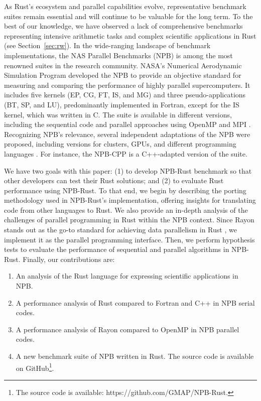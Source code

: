 As Rust's ecosystem and parallel capabilities evolve, representative benchmark suites remain essential and will continue to be valuable for the long term. To the best of our knowledge, we have observed a lack of comprehensive benchmarks representing intensive arithmetic tasks and complex scientific applications in Rust (see Section~\ref{sec:rw}). In the wide-ranging landscape of benchmark implementations, the NAS Parallel Benchmarks (NPB) \cite{NPBOriginal1} is among the most renowned suites in the research community. NASA's Numerical Aerodynamic Simulation Program developed the NPB to provide an objective standard for measuring and comparing the performance of highly parallel supercomputers. It includes five kernels (EP, CG, FT, IS, and MG) and three pseudo-applications (BT, SP, and LU), predominantly implemented in Fortran, except for the IS kernel, which was written in C. The suite is available in different versions, including the sequential code and parallel approaches using OpenMP \cite{nasomp} and MPI \cite{NPB-2.0}. Recognizing NPB's relevance, several independent adaptations of the NPB were proposed, including versions for clusters, GPUs, and different programming languages \cite{NPB-CPP-2021, NPB-MPJ, NPB-PY, NPB-CUDA, npb-opencl, npb-openacc}. For instance, the NPB-CPP \cite{NPB-CPP-2021} is a C++-adapted version of the suite. 

We have two goals with this paper: (1) to develop NPB-Rust benchmark so that other developers can test their Rust solutions; and (2) to evaluate Rust performance using NPB-Rust. To that end, we begin by describing the porting methodology used in NPB-Rust's implementation, offering insights for translating code from other languages to Rust. We also provide an in-depth analysis of the challenges of parallel programming in Rust within the NPB context. Since Rayon stands out as the go-to standard for achieving data parallelism in Rust \cite{PIEPER:COLA:21}, we implement it as the parallel programming interface. Then, we perform hypothesis tests to evaluate the performance of sequential and parallel algorithms in NPB-Rust. Finally, 
%
our contributions are:
\begin{enumerate}
    \item An analysis of the Rust language for expressing scientific applications in NPB.
    \item A performance analysis of Rust compared to Fortran and C++ in NPB serial codes.
    \item A performance analysis of Rayon compared to OpenMP in NPB parallel codes.
    \item A new benchmark suite of NPB written in Rust. The source code is available on GitHub\footnote{The source code is available: https://github.com/GMAP/NPB-Rust.}.
\end{enumerate}

